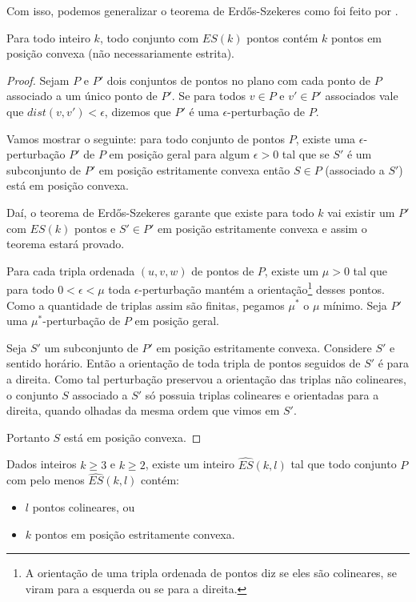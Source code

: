 Com isso, podemos generalizar o teorema de Erd\H os-Szekeres como foi feito por \cite{pentagon}.

\begin{teorema}\label{EScolinear}
    Para todo inteiro $k$, todo conjunto com $ES(k)$ pontos contém $k$ pontos em posição convexa (não necessariamente estrita).
\end{teorema}
\begin{proof}
    Sejam $P$ e $P'$ dois conjuntos de pontos no plano com cada ponto de $P$ associado a um único ponto de $P'$. Se para todos $v\in P$ e $v'\in P'$ associados vale que $dist(v,v')<\epsilon$, dizemos que $P'$ é uma $\epsilon$-perturbação de $P$.

    Vamos mostrar o seguinte: para todo conjunto de pontos $P$, existe uma $\epsilon$-perturbação $P'$ de $P$ em posição geral para algum $\epsilon>0$ tal que se $S'$ é um subconjunto de $P'$ em posição estritamente convexa então $S\in P$ (associado a $S'$) está em posição convexa.

    Daí, o teorema de Erd\H os-Szekeres garante que existe para todo $k$ vai existir um $P'$ com $ES(k)$ pontos e $S'\in P'$ em posição estritamente convexa e assim o teorema estará provado.
    
    Para cada tripla ordenada $(u,v,w)$ de pontos de $P$, existe um $\mu>0$ tal que para todo $0<\epsilon<\mu$ toda $\epsilon$-perturbação mantém a orientação\footnote{A orientação de uma tripla ordenada de pontos diz se eles são colineares, se viram para a esquerda ou se para a direita.} desses pontos. Como a quantidade de triplas assim são finitas, pegamos $\mu^*$ o $\mu$ mínimo. Seja $P'$ uma $\mu^*$-perturbação de $P$ em posição geral.

    Seja $S'$ um subconjunto de $P'$ em posição estritamente convexa. Considere $S'$ e sentido horário. Então a orientação de toda tripla de pontos seguidos de $S'$ é para a direita. Como tal perturbação preservou a orientação das triplas não colineares, o conjunto $S$ associado a $S'$ só possuia triplas colineares e orientadas para a direita, quando olhadas da mesma ordem que vimos em $S'$.

    Portanto $S$ está em posição convexa.
\end{proof}
\begin{teorema}
    Dados inteiros $k\geq 3$ e $k\geq 2$, existe um inteiro $\widehat{ES}(k,l)$ tal que todo conjunto $P$ com pelo menos $\widehat{ES}(k,l)$ contém:
    \begin{itemize}
        \item $l$ pontos colineares, ou
        \item $k$ pontos em posição estritamente convexa.
    \end{itemize}
\end{teorema}
